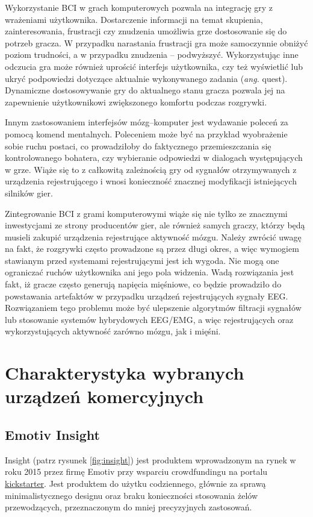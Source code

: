 \documentclass[skorowidz,skroty]{dyplomWEZUT}
\begin{document}
Wykorzystanie BCI w grach komputerowych pozwala na integrację gry z wrażeniami użytkownika. Dostarczenie informacji na temat skupienia, zainteresowania, frustracji czy znudzenia umożliwia grze dostosowanie się do potrzeb gracza. W przypadku narastania frustracji gra może samoczynnie obniżyć poziom trudności, a w przypadku znudzenia -- podwyższyć. Wykorzystując inne odczucia gra może również uprościć interfejs użytkownika, czy też wyświetlić lub ukryć podpowiedzi dotyczące aktualnie wykonywanego zadania (\textit{ang.} quest). Dynamiczne dostosowywanie gry do aktualnego stanu gracza pozwala jej na zapewnienie użytkownikowi zwiększonego komfortu podczas rozgrywki.

Innym zastosowaniem interfejsów mózg--komputer jest wydawanie poleceń za pomocą komend mentalnych. Poleceniem może być na przykład wyobrażenie sobie ruchu postaci, co prowadziłoby do faktycznego przemieszczania się kontrolowanego bohatera, czy wybieranie odpowiedzi w dialogach występujących w grze. Wiąże się to z całkowitą zależnością gry od sygnałów otrzymywanych z urządzenia rejestrującego i wnosi konieczność znacznej modyfikacji istniejących silników gier.

Zintegrowanie BCI z grami komputerowymi wiąże się nie tylko ze znacznymi inwestycjami ze strony producentów gier, ale również samych graczy, którzy będą musieli zakupić urządzenia rejestrujące aktywność mózgu. Należy zwrócić uwagę na fakt, że rozgrywki często prowadzone są przez długi okres, a więc wymogiem stawianym przed systemami rejestrującymi jest ich wygoda. Nie mogą one ograniczać ruchów użytkownika ani jego pola widzenia. Wadą rozwiązania jest fakt, iż gracze często generują napięcia mięśniowe, co będzie prowadziło do powstawania artefaktów w przypadku urządzeń rejestrujących sygnały EEG. Rozwiązaniem tego problemu może być ulepszenie algorytmów filtracji sygnałów lub stosowanie systemów hybrydowych EEG/EMG, a więc rejestrujących oraz wykorzystujących aktywność zarówno mózgu, jak i mięśni\cite{bci_introduction}.


\chapter{Charakterystyka wybranych urządzeń komercyjnych\label{chap:headsets}}
\section{Emotiv Insight\label{section:insight}}
Insight (patrz rysunek \vref{fig:insight}) jest produktem wprowadzonym na rynek w roku 2015 przez firmę Emotiv przy wsparciu crowdfundingu na portalu \href{www.kickstarter.com}{kickstarter}. Jest produktem do użytku codziennego, głównie za sprawą minimalistycznego designu oraz braku konieczności stosowania żelów przewodzących, przeznaczonym do mniej precyzyjnych zastosowań.
\end{document}
